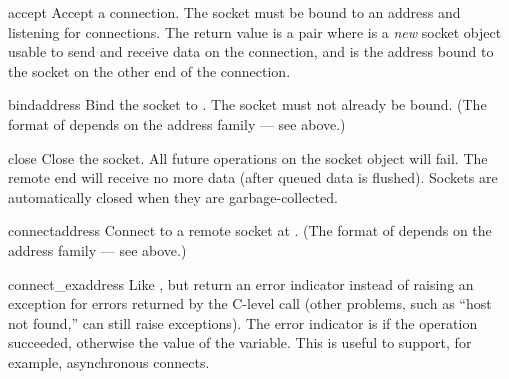 \begin{methoddesc}[socket]{accept}{}
Accept a connection.
The socket must be bound to an address and listening for connections.
The return value is a pair 
where  is a \emph{new} socket object usable to send and
receive data on the connection, and  is the address bound
to the socket on the other end of the connection.
\end{methoddesc}

\begin{methoddesc}[socket]{bind}{address}
Bind the socket to .  The socket must not already be bound.
(The format of  depends on the address family --- see
above.)  
\end{methoddesc}

\begin{methoddesc}[socket]{close}{}
Close the socket.  All future operations on the socket object will fail.
The remote end will receive no more data (after queued data is flushed).
Sockets are automatically closed when they are garbage-collected.
\end{methoddesc}

\begin{methoddesc}[socket]{connect}{address}
Connect to a remote socket at .
(The format of  depends on the address family --- see
above.)  
\end{methoddesc}

\begin{methoddesc}[socket]{connect_ex}{address}
Like , but return an error indicator
instead of raising an exception for errors returned by the C-level
 call (other problems, such as ``host not found,''
can still raise exceptions).  The error indicator is  if the
operation succeeded, otherwise the value of the 
variable.  This is useful to support, for example, asynchronous connects.
\end{methoddesc}

